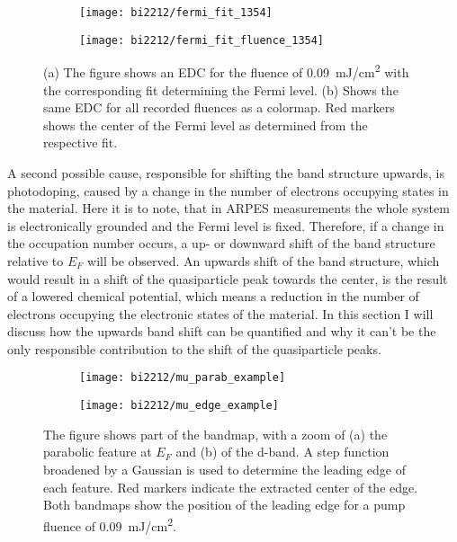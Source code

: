 \begin{figure}[t]
	\centering
	\begin{subfigure}[b]{0.33\textwidth}
		\texttt{[image: bi2212/fermi\_fit\_1354]}
		\caption{}
	\end{subfigure}
	\begin{subfigure}[b]{0.33\textwidth}
		\texttt{[image: bi2212/fermi\_fit\_fluence\_1354]}
		\caption{}
	\end{subfigure}
	\caption{(a) The figure shows an EDC for the fluence of \qty{0.09}{\milli\joule/\centi\meter\squared} with the corresponding fit determining the Fermi level. (b) Shows the same EDC for all recorded fluences as a colormap. Red markers shows the center of the Fermi level as determined from the respective fit.}
	\label{fig:fermi_fit_bi2212}
\end{figure}

A second possible cause, responsible for shifting the band structure upwards, is photodoping, caused by a change in the number of electrons occupying states in the material.
Here it is to note, that in ARPES measurements the whole system is electronically grounded and the Fermi level is fixed.
Therefore, if a change in the occupation number occurs, a up- or downward shift of the band structure relative to $E_F$ will be observed.
An upwards shift of the band structure, which would result in a shift of the quasiparticle peak towards the center, is the result of a lowered chemical potential, which means a reduction in the number of electrons occupying the electronic states of the material.
In this section I will discuss how the upwards band shift can be quantified and why it can't be the only responsible contribution to the shift of the quasiparticle peaks.

\begin{figure}[b!]
	\centering
	\begin{subfigure}[b]{0.27\textwidth}
		\texttt{[image: bi2212/mu\_parab\_example]}
		\caption{}
	\end{subfigure}
	\begin{subfigure}[b]{0.33\textwidth}
		\texttt{[image: bi2212/mu\_edge\_example]}
		\caption{}
	\end{subfigure}
	\caption{The figure shows part of the bandmap, with a zoom of (a) the parabolic feature at $E_F$ and (b) of the  d-band. A step function broadened by a Gaussian is used to determine the leading edge of each feature. Red markers indicate the extracted center of the edge. Both bandmaps show the position of the leading edge for a pump fluence of \qty{0.09}{\milli\joule/\centi\meter\squared}.}
	\label{fig:mu_center}
\end{figure}

